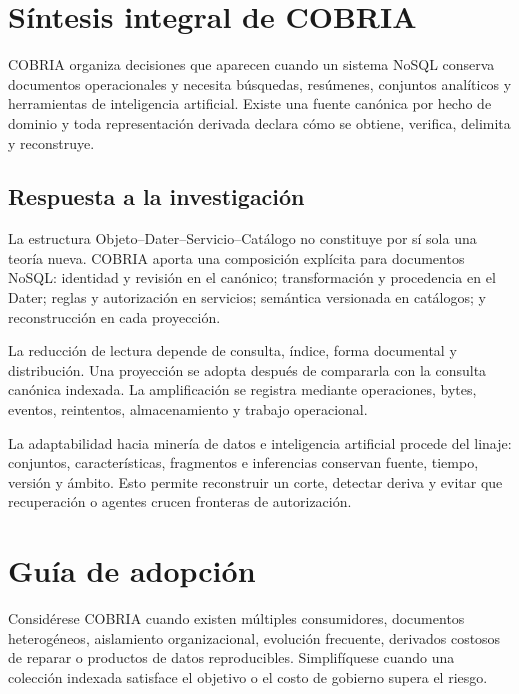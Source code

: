 \chapter{Síntesis integral de COBRIA}

COBRIA organiza decisiones que aparecen cuando un sistema NoSQL conserva documentos
operacionales y necesita búsquedas, resúmenes, conjuntos analíticos y herramientas de
inteligencia artificial. Existe una fuente canónica por hecho de dominio y toda
representación derivada declara cómo se obtiene, verifica, delimita y reconstruye.

\section{Respuesta a la investigación}

La estructura Objeto--Dater--Servicio--Catálogo no constituye por sí sola una teoría
nueva. COBRIA aporta una composición explícita para documentos NoSQL: identidad y
revisión en el canónico; transformación y procedencia en el Dater; reglas y autorización
en servicios; semántica versionada en catálogos; y reconstrucción en cada proyección.

La reducción de lectura depende de consulta, índice, forma documental y distribución.
Una proyección se adopta después de compararla con la consulta canónica indexada. La
amplificación se registra mediante operaciones, bytes, eventos, reintentos,
almacenamiento y trabajo operacional.

La adaptabilidad hacia minería de datos e inteligencia artificial procede del linaje:
conjuntos, características, fragmentos e inferencias conservan fuente, tiempo, versión y
ámbito. Esto permite reconstruir un corte, detectar deriva y evitar que recuperación o
agentes crucen fronteras de autorización.

\chapter{Guía de adopción}

Considérese COBRIA cuando existen múltiples consumidores, documentos heterogéneos,
aislamiento organizacional, evolución frecuente, derivados costosos de reparar o
productos de datos reproducibles. Simplifíquese cuando una colección indexada satisface
el objetivo o el costo de gobierno supera el riesgo.

